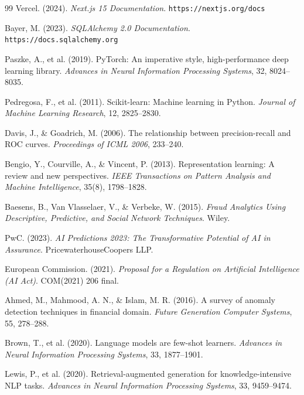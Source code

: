 \documentclass[12pt,a4paper,twoside]{report}
\theoremstyle{definition}
\begin{document}
\begin{thebibliography}{99}
Vercel. (2024).
\textit{Next.js 15 Documentation}.
\texttt{https://nextjs.org/docs}

Bayer, M. (2023).
\textit{SQLAlchemy 2.0 Documentation}.
\texttt{https://docs.sqlalchemy.org}

Paszke, A., et al. (2019).
PyTorch: An imperative style, high-performance deep learning library.
\textit{Advances in Neural Information Processing Systems}, 32, 8024--8035.

Pedregosa, F., et al. (2011).
Scikit-learn: Machine learning in Python.
\textit{Journal of Machine Learning Research}, 12, 2825--2830.

Davis, J., \& Goadrich, M. (2006).
The relationship between precision-recall and ROC curves.
\textit{Proceedings of ICML 2006}, 233--240.

Bengio, Y., Courville, A., \& Vincent, P. (2013).
Representation learning: A review and new perspectives.
\textit{IEEE Transactions on Pattern Analysis and Machine Intelligence},
35(8), 1798--1828.

Baesens, B., Van Vlasselaer, V., \& Verbeke, W. (2015).
\textit{Fraud Analytics Using Descriptive, Predictive, and Social Network
Techniques}. Wiley.

PwC. (2023).
\textit{AI Predictions 2023: The Transformative Potential of AI in Assurance}.
PricewaterhouseCoopers LLP.

European Commission. (2021).
\textit{Proposal for a Regulation on Artificial Intelligence (AI Act)}.
COM(2021) 206 final.

Ahmed, M., Mahmood, A. N., \& Islam, M. R. (2016).
A survey of anomaly detection techniques in financial domain.
\textit{Future Generation Computer Systems}, 55, 278--288.

Brown, T., et al. (2020).
Language models are few-shot learners.
\textit{Advances in Neural Information Processing Systems}, 33, 1877--1901.

Lewis, P., et al. (2020).
Retrieval-augmented generation for knowledge-intensive NLP tasks.
\textit{Advances in Neural Information Processing Systems}, 33, 9459--9474.

\end{thebibliography}

\appendix
\end{document}
